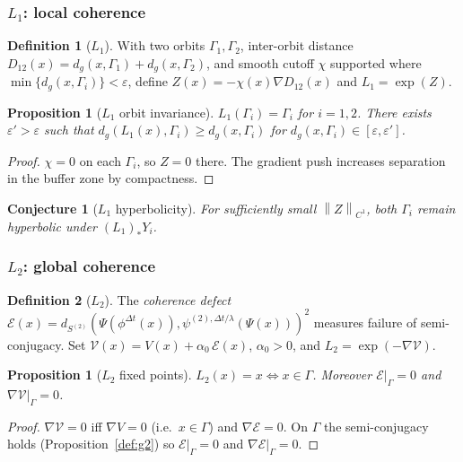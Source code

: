 \documentclass[12pt, oneside]{book}
\theoremstyle{plain}
\newtheorem{proposition}[theorem]{Proposition}
\newtheorem{conjecture}[theorem]{Conjecture}
\theoremstyle{definition}
\newtheorem{definition}{Definition}[section]
\theoremstyle{remark}
\newcommand{\Orb}{\Gamma}
\newcommand{\cV}{\mathcal{V}}
\newcommand{\eps}{\varepsilon}
\newcommand{\dg}{d_g}
\newcommand{\norm}[1]{\left\|#1\right\|}
\begin{document}
\subsubsection{\texorpdfstring{$L_1$}{L1}: local coherence}

\begin{definition}[$L_1$]\label{def:L1}
With two orbits $\Orb_1,\Orb_2$, inter-orbit distance
$D_{12}(x)=\dg(x,\Orb_1)+\dg(x,\Orb_2)$, and smooth cutoff
$\chi$ supported where $\min\{\dg(x,\Orb_i)\}<\eps$, define
$Z(x)=-\chi(x)\nabla D_{12}(x)$ and $L_1=\exp(Z)$.
\end{definition}

\begin{proposition}[$L_1$ orbit invariance]\label{prop:L1}
$L_1(\Orb_i)=\Orb_i$ for $i=1,2$. There exists $\eps'>\eps$ such
that $\dg(L_1(x),\Orb_i)\ge\dg(x,\Orb_i)$ for
$\dg(x,\Orb_i)\in[\eps,\eps']$.
\end{proposition}
\begin{proof}
$\chi=0$ on each $\Orb_i$, so $Z=0$ there. The gradient push
increases separation in the buffer zone by compactness.
\end{proof}

\begin{conjecture}[$L_1$ hyperbolicity]\label{conj:L1}
For sufficiently small $\norm{Z}_{C^1}$, both $\Orb_i$ remain
hyperbolic under $(L_1)_*Y_i$.
\end{conjecture}

\subsubsection{\texorpdfstring{$L_2$}{L2}: global coherence}

\begin{definition}[$L_2$]\label{def:L2}
The \emph{coherence defect}
$\mathcal{E}(x)=d_{S^{(2)}}(\Psi(\phi^{\Delta t}(x)),
\psi^{(2),\Delta t/\lambda}(\Psi(x)))^2$ measures failure of
semi-conjugacy. Set $\cV(x)=V(x)+\alpha_0\,\mathcal{E}(x)$,
$\alpha_0>0$, and $L_2=\exp(-\nabla\cV)$.
\end{definition}

\begin{proposition}[$L_2$ fixed points]\label{prop:L2}
$L_2(x)=x\iff x\in\Orb$. Moreover $\mathcal{E}|_{\Orb}=0$ and
$\nabla\cV|_{\Orb}=0$.
\end{proposition}
\begin{proof}
$\nabla\cV=0$ iff $\nabla V=0$ (i.e.\ $x\in\Orb$) and
$\nabla\mathcal{E}=0$. On $\Orb$ the semi-conjugacy holds
(Proposition~\ref{def:g2}) so $\mathcal{E}|_{\Orb}=0$ and
$\nabla\mathcal{E}|_{\Orb}=0$.
\end{proof}
\end{document}

